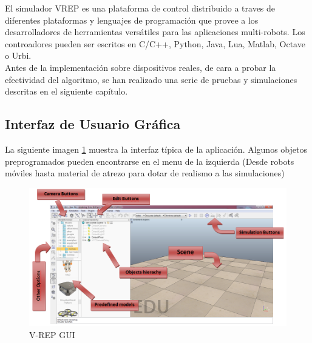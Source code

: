 El simulador VREP es una plataforma de control distribuido a traves de diferentes plataformas y lenguajes de programaci\'on que provee a los desarrolladores de herramientas vers\'atiles para las aplicaciones multi-robots. Los controadores pueden ser escritos en C/C++, Python, Java, Lua, Matlab, Octave o Urbi. \\

Antes de la implementaci\'on sobre dispositivos reales, de cara a probar la efectividad del algoritmo, se han realizado una serie de pruebas y simulaciones descritas en el siguiente cap\'itulo. 

\subsection{Interfaz de Usuario Gr\'afica}

La siguiente imagen \ref{fig:VREP_GUI} muestra la interfaz t\'ipica de la aplicaci\'on. Algunos objetos preprogramados pueden encontrarse en el menu de la izquierda (Desde robots m\'oviles hasta material de atrezo para dotar de realismo a las simulaciones)

\begin{figure}
	\includegraphics[width=\textwidth,natwidth=964,natheight=520]{../Images/c3/vrep_main.png}
	\caption{V-REP GUI}
	\label{fig:VREP_GUI}
\end{figure}


